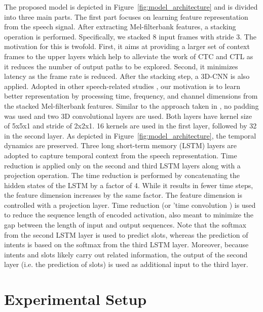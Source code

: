 \documentclass[a4paper]{article}
\begin{document}
The proposed model is depicted in Figure~\ref{fig:model_architecture} and is divided into three main parts. The first part focuses on learning feature representation from the speech signal. After extracting Mel-filterbank features, a stacking operation is performed. Specifically, we stacked 8 input frames with stride 3. The motivation for this is twofold. First, it aims at providing a larger set of context frames to the upper layers which help to alleviate the work of CTC and CTL as it reduces the number of output paths to be explored. Second, it minimizes latency as the frame rate is reduced. After the stacking step, a 3D-CNN is also applied. Adopted in other speech-related studies \cite{kim2017learning}\cite{ganapathy20183}\cite{meng2019speech}, our motivation is to learn better representation by processing time, frequency, and channel dimensions from the stacked Mel-filterbank features. Similar to the approach taken in \cite{ganapathy20183}, no padding was used and two 3D convolutional layers are used. Both layers have kernel size of 5x5x1 and stride of 2x2x1. 16 kernels are used in the first layer, followed by 32 in the second layer. As depicted in Figure~\ref{fig:model_architecture}, the temporal dynamics are preserved. Three long short-term memory (LSTM) layers are adopted to capture temporal context from the speech representation. Time reduction is applied only on the second and third LSTM layers along with a projection operation. The time reduction is performed by concatenating the hidden states of the LSTM by a factor of 4. While it results in fewer time steps, the feature dimension increases by the same factor. The feature dimension is controlled with a projection layer. Time reduction (or 'time convolution \cite{rao2017exploring}) is used to reduce the sequence length of encoded activation, also meant to minimize the gap between the length of input and output sequences. Note that the softmax from the second LSTM layer is used to predict slots, whereas the prediction of intents is based on the softmax from the third LSTM layer. Moreover, because intents and slots likely carry out related information, the output of the second layer (i.e. the prediction of slots) is used as additional input to the third layer.









\section{Experimental Setup}
\label{sec:setup}
\end{document}
